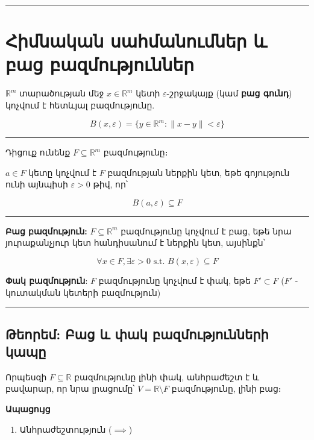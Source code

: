 \documentclass[12pt, a4paper]{article}
\begin{document}
\tableofcontents
\vspace{2em}
\hrule
\vspace{2em}

\section{Հիմնական սահմանումներ և բաց բազմություններ}

$\mathbb{R}^m$ տարածության մեջ $x \in \mathbb{R}^m$ կետի $\varepsilon$-շրջակայք (կամ \textbf{բաց գունդ}) կոչվում է հետևյալ բազմությունը.

$$B(x, \varepsilon) = \{y \in \mathbb{R}^m : \|x - y\| < \varepsilon\}$$

\vspace{1em}
\hrule
\vspace{1em}

Դիցուք ունենք $F \subseteq \mathbb{R}^m$ բազմությունը։

$a \in F$ կետը կոչվում է $F$ բազմության ներքին կետ, եթե գոյություն ունի այնպիսի $\varepsilon > 0$ թիվ, որ՝

$$B(a, \varepsilon) \subseteq F$$

\vspace{1em}
\hrule
\vspace{1em}

\textbf{Բաց բազմություն:} $F \subseteq \mathbb{R}^m$ բազմությունը կոչվում է բաց, եթե նրա յուրաքանչյուր կետ հանդիսանում է ներքին կետ, այսինքն՝

$$\forall x \in F, \exists \varepsilon > 0 \text{ s.t. } B(x, \varepsilon) \subseteq F$$

\textbf{Փակ բազմություն}: $F$ բազմությունը կոչվում է փակ, եթե $F'\subset F$ ($F'$ - կուտակման կետերի բազմություն)

\vspace{1em}
\hrule
\vspace{1em}

\subsection{Թեորեմ: Բաց և փակ բազմությունների կապը}

Որպեսզի $F \subseteq \mathbb{R}$ բազմությունը լինի փակ, անհրաժեշտ է և բավարար, որ նրա լրացումը՝ $V = \mathbb{R} \setminus F$ բազմությունը, լինի բաց։

\textbf{Ապացույց}

\begin{enumerate}
    \item Անհրաժեշտություն ($\implies$)
\end{enumerate}
\end{document}
